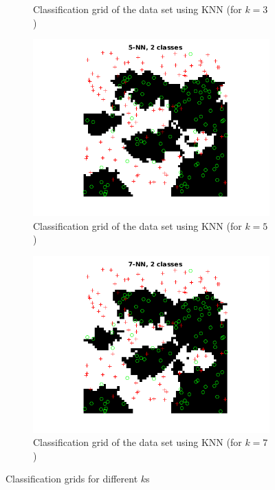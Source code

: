 \documentclass[10pt]{article}
\begin{document}
\begin{figure}[H]
\begin{subfigure}{.48\textwidth}
    \caption{Classification grid of the data set using KNN (for $k=3$)}
    \label{fig2.1b}
  \end{subfigure}
  \begin{subfigure}{.48\textwidth}
    \includegraphics[width=1\textwidth]{assign2_2_5.png}
    \caption{Classification grid of the data set using KNN (for $k=5$)}
    \label{fig2.1c}
  \end{subfigure}
  \begin{subfigure}{.48\textwidth}
    \includegraphics[width=1\textwidth]{assign2_2_7.png}
    \caption{Classification grid of the data set using KNN (for $k=7$)}
    \label{fig2.1d}
  \end{subfigure}
  \caption{Classification grids for different $k$s}
  \label{fig2.1}
\end{figure}
\end{document}
